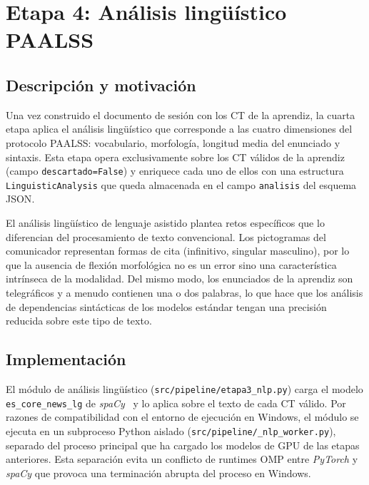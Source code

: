 \section{Etapa 4: Análisis lingüístico PAALSS}
\label{sec:etapa_nlp}

\subsection{Descripción y motivación}
\label{subsec:nlp_desc}

Una vez construido el documento de sesión con los \ac{CT} de la aprendiz, la cuarta
etapa aplica el análisis lingüístico que corresponde a las cuatro dimensiones del
protocolo \ac{PAALSS}: vocabulario, morfología, longitud media del enunciado y
sintaxis. Esta etapa opera exclusivamente sobre los \ac{CT} válidos de la aprendiz
(campo \texttt{descartado=False}) y enriquece cada uno de ellos con una estructura
\texttt{LinguisticAnalysis} que queda almacenada en el campo \texttt{analisis} del
esquema \ac{JSON}.

El análisis lingüístico de lenguaje asistido plantea retos específicos que lo
diferencian del procesamiento de texto convencional. Los pictogramas del comunicador
representan formas de cita (infinitivo, singular masculino), por lo que la
ausencia de flexión morfológica no es un error sino una característica intrínseca de
la modalidad. Del mismo modo, los enunciados de la aprendiz son telegráficos y a menudo
contienen una o dos palabras, lo que hace que los análisis de dependencias sintácticas
de los modelos estándar tengan una precisión reducida sobre este tipo de texto.


\subsection{Implementación}
\label{subsec:nlp_impl}

El módulo de análisis lingüístico (\texttt{src/pipeline/etapa3\_nlp.py}) carga el
modelo \texttt{es\_core\_news\_lg} de \emph{spaCy}~\cite{spoken_spanish_pos} y lo
aplica sobre el texto de cada \ac{CT} válido. Por razones de compatibilidad con el
entorno de ejecución en Windows, el módulo se ejecuta en un subproceso Python aislado
(\texttt{src/pipeline/\_nlp\_worker.py}), separado del proceso principal que ha
cargado los modelos de \ac{GPU} de las etapas anteriores. Esta separación evita un
conflicto de runtimes \ac{OMP} entre \emph{PyTorch} y \emph{spaCy} que provoca una
terminación abrupta del proceso en Windows.

